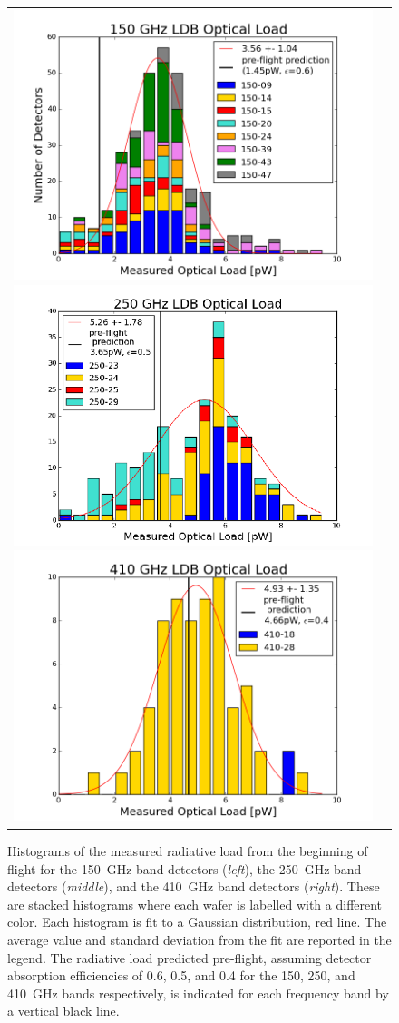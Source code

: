\documentclass[../EBEXPaper2.tex]{subfiles}
\begin{document}
\begin{figure}[ht!]
\begin{center}
\begin{tabular}{cc}
\includegraphics[width=0.33\columnwidth]{images/ldb_optical_load_150s}
\includegraphics[width=0.33\columnwidth]{images/ldb_optical_load_250s}
\includegraphics[width=0.33\columnwidth]{images/ldb_optical_load_410s}
\end{tabular}
\caption{Histograms of the measured radiative load from the beginning of flight for the 150~GHz band detectors ({\it left}), the 250~GHz band detectors ({\it middle}), and the 410~GHz band detectors ({\it right}). These are stacked histograms where each wafer is labelled with a different color. Each histogram is fit to a Gaussian distribution, red line. The average value and standard deviation from the fit are reported in the legend. The radiative load predicted pre-flight, assuming detector absorption efficiencies of 0.6, 0.5, and 0.4 for the 150, 250, and 410~GHz bands respectively, is indicated for each frequency band by a vertical black line.}  %
\label{fig:radiative_load_histograms}
\end{center}
\end{figure}




%
\end{document}
